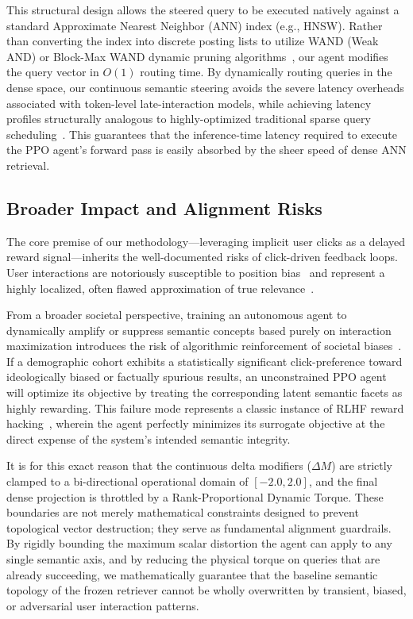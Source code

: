 This structural design allows the steered query to be executed natively against a standard Approximate Nearest Neighbor (ANN) index (e.g., HNSW). Rather than converting the index into discrete posting lists to utilize WAND (Weak AND) or Block-Max WAND dynamic pruning algorithms~\citep{broder2003}, our agent modifies the query vector in $O(1)$ routing time. By dynamically routing queries in the dense space, our continuous semantic steering avoids the severe latency overheads associated with token-level late-interaction models, while achieving latency profiles structurally analogous to highly-optimized traditional sparse query scheduling~\citep{macdonald2012}. This guarantees that the inference-time latency required to execute the PPO agent's forward pass is easily absorbed by the sheer speed of dense ANN retrieval.

\subsection{Broader Impact and Alignment Risks}
The core premise of our methodology—leveraging implicit user clicks as a delayed reward signal—inherits the well-documented risks of click-driven feedback loops. User interactions are notoriously susceptible to position bias~\citep{craswell2008} and represent a highly localized, often flawed approximation of true relevance~\citep{joachims2017}.

From a broader societal perspective, training an autonomous agent to dynamically amplify or suppress semantic concepts based purely on interaction maximization introduces the risk of algorithmic reinforcement of societal biases~\citep{baeza-yates2018, noble2018}. If a demographic cohort exhibits a statistically significant click-preference toward ideologically biased or factually spurious results, an unconstrained PPO agent will optimize its objective by treating the corresponding latent semantic facets as highly rewarding. This failure mode represents a classic instance of RLHF reward hacking~\citep{amodei2016, skalse2022}, wherein the agent perfectly minimizes its surrogate objective at the direct expense of the system's intended semantic integrity.

It is for this exact reason that the continuous delta modifiers ($\Delta M$) are strictly clamped to a bi-directional operational domain of $[-2.0, 2.0]$, and the final dense projection is throttled by a Rank-Proportional Dynamic Torque. These boundaries are not merely mathematical constraints designed to prevent topological vector destruction; they serve as fundamental alignment guardrails. By rigidly bounding the maximum scalar distortion the agent can apply to any single semantic axis, and by reducing the physical torque on queries that are already succeeding, we mathematically guarantee that the baseline semantic topology of the frozen retriever cannot be wholly overwritten by transient, biased, or adversarial user interaction patterns.


